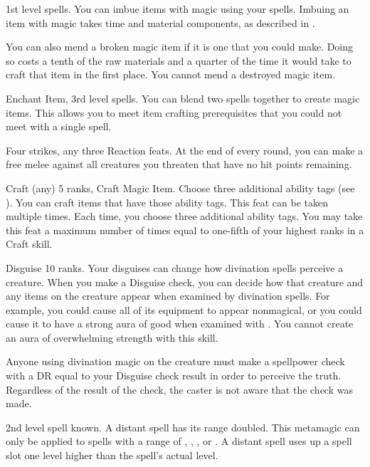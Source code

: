 \featpre 1st level spells.
\featben You can imbue items with magic using your spells.
Imbuing an item with magic takes time and material components, as described in .

You can also mend a broken magic item if it is one that you could make.
Doing so costs a tenth of the raw materials and a quarter of the time it would take to craft that item in the first place.
You cannot mend a destroyed magic item.

\featpres Enchant Item, 3rd level spells.
\featben You can blend two spells together to create magic items.
This allows you to meet item crafting prerequisites that you could not meet with a single spell.

\featpres Four strikes, any three Reaction feats.
\featben At the end of every round, you can make a free melee  against all creatures you threaten that have no hit points remaining.

\featpres Craft (any) 5 ranks, Craft Magic Item.
\featben Choose three additional ability tags (see ).
You can craft items that have those ability tags.
 This feat can be taken multiple times.
Each time, you choose three additional ability tags.
You may take this feat a maximum number of times equal to one-fifth of your highest ranks in a Craft skill.

\featpre Disguise 10 ranks.
\featben Your disguises can change how divination spells perceive a creature.
When you make a Disguise check, you can decide how that creature and any items on the creature appear when examined by divination spells.
For example, you could cause all of its equipment to appear nonmagical, or you could cause it to have a strong aura of good when examined with .
You cannot create an aura of overwhelming strength with this skill.

Anyone using divination magic on the creature must make a spellpower check with a DR equal to your Disguise check result in order to perceive the truth.
Regardless of the result of the check, the caster is not aware that the check was made.

\featpre 2nd level spell known.
\featben A distant spell has its range doubled.
This metamagic can only be applied to spells with a range of \rngclose, \rngmed, \rnglong, or \rngext.
A distant spell uses up a spell slot one level higher than the spell's actual level.


